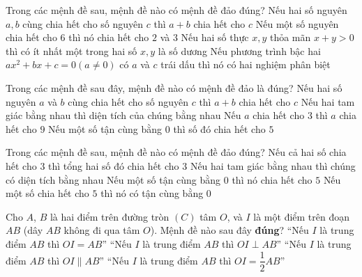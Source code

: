 \begin{ex}%
	Trong các mệnh đề sau, mệnh đề nào có mệnh đề đảo đúng?
	\choice
	{Nếu hai số nguyên $a, b$ cùng chia hết cho số nguyên $c$ thì $a+b$ chia hết cho $c$}
	{\True Nếu một số nguyên chia hết cho $6$ thì nó chia hết cho $2$ và $3$}
	{Nếu hai số thực $x, y$ thỏa mãn $x+y>0$ thì có ít nhất một trong hai số $x, y$ là số dương}
	{Nếu phương trình bậc hai $ax^2+bx+c=0 (a \ne 0)$ có $a$ và $c$ trái dấu thì nó có hai nghiệm phân biệt}
\end{ex}
\begin{ex}%
	Trong các mệnh đề sau đây, mệnh đề nào có mệnh đề đảo là đúng?
	\choice 
	{Nếu hai số nguyên $a$ và $b$ cùng chia hết cho số nguyên $c$ thì $a+b$ chia hết cho $c$} 
	{Nếu hai tam giác bằng nhau thì diện tích của chúng bằng nhau} 
	{\True Nếu $a$ chia hết cho $3$ thì $a$ chia hết cho $9$} 
	{Nếu một số tận cùng bằng $0$ thì số đó chia hết cho $5$} 
\end{ex} 
\begin{ex}%
	Trong các mệnh đề sau, mệnh đề nào có mệnh đề đảo đúng?
	\choice
	{Nếu cả hai số chia hết cho $3$ thì tổng hai số đó chia hết cho $3$}
	{Nếu hai tam giác bằng nhau thì chúng có diện tích bằng nhau}
	{Nếu một số tận cùng bằng $0$ thì nó chia hết cho $5$}
	{\True Nếu một số chia hết cho $5$ thì nó có tận cùng bằng $0$}
\end{ex}

\begin{ex}%
	Cho $A$, $B$ là hai điểm trên đường tròn $(C)$ tâm $O$, và $I$ là một điểm trên đoạn $AB$ (dây $AB$ không đi qua tâm $O$). Mệnh đề nào sau đây \textbf{đúng}?
	\choice
	{``Nếu $I$ là trung điểm $AB$ thì $OI=AB$''}
	{\True ``Nếu $I$ là trung điểm $AB$ thì $OI \perp AB$''}
	{``Nếu $I$ là trung điểm $AB$ thì $OI \parallel AB$''}
	{``Nếu $I$ là trung điểm $AB$ thì $OI =\dfrac{1}{2}AB$''} 
\end{ex}


